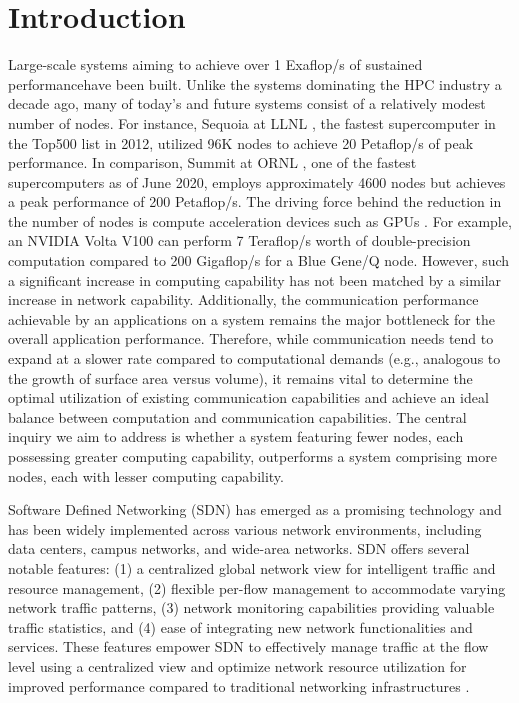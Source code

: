 \chapter{Introduction}

Large-scale systems aiming to achieve over 1 Exaflop/s of sustained performancehave been built. Unlike the systems dominating the HPC industry
a decade ago, many of today's and future systems consist of a relatively modest
number of nodes. For instance, Sequoia at LLNL \cite{sequa}, the fastest supercomputer in
the Top500 list in 2012, utilized 96K nodes to achieve 20 Petaflop/s of peak
performance. In comparison, Summit at ORNL \cite{summit}, one of the fastest
supercomputers as of June 2020, employs approximately 4600 nodes but achieves a
peak performance of 200 Petaflop/s. The driving force behind the reduction in the
number of nodes is compute acceleration devices such as GPUs \cite{owens2008gpu}. For example,
an NVIDIA Volta V100 can perform 7 Teraflop/s worth of double-precision
computation compared to 200 Gigaflop/s for a Blue Gene/Q node. However, such a
significant increase in computing capability has not been matched by a similar
increase in network capability. Additionally, the communication performance
achievable by an applications on a system remains the major bottleneck for the overall 
application performance.  Therefore, while communication needs tend to expand at a slower
rate compared to computational demands (e.g., analogous to the growth of surface
area versus volume), it remains vital to determine the optimal utilization of
existing communication capabilities and achieve an ideal balance between
computation and communication capabilities.  The central inquiry we aim to
address is whether a system featuring fewer nodes, each possessing greater
computing capability, outperforms a system comprising more nodes, each with
lesser computing capability. 


Software Defined Networking (SDN) \cite{kreutz2014software} has emerged as a promising technology and
has been widely implemented across various network environments, including data
centers, campus networks, and wide-area networks. SDN offers several notable
features: (1) a centralized global network view for intelligent traffic and
resource management, (2) flexible per-flow management to accommodate varying
network traffic patterns, (3) network monitoring capabilities providing valuable
traffic statistics, and (4) ease of integrating new network functionalities and
services. These features empower SDN to effectively manage traffic at the flow
level using a centralized view and optimize network resource utilization for
improved performance compared to traditional networking infrastructures \cite{tr2016sdn}.

